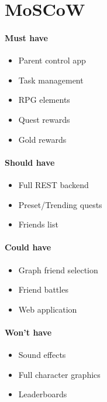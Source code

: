 \chapter{MoSCoW}

\subsubsection{Must have}
\begin{itemize}
	\item Parent control app
	\item Task management
	\item RPG elements
	\item Quest rewards
	\item Gold rewards
\end{itemize}

\subsubsection{Should have}
\begin{itemize}
	\item Full REST backend
	\item Preset/Trending quests
	\item Friends list
\end{itemize}

\subsubsection{Could have}
\begin{itemize}
	\item Graph friend selection 
	\item Friend battles
	\item Web application
\end{itemize}

\subsubsection{Won't have}
\begin{itemize}
	\item Sound effects
	\item Full character graphics
	\item Leaderboards
\end{itemize}